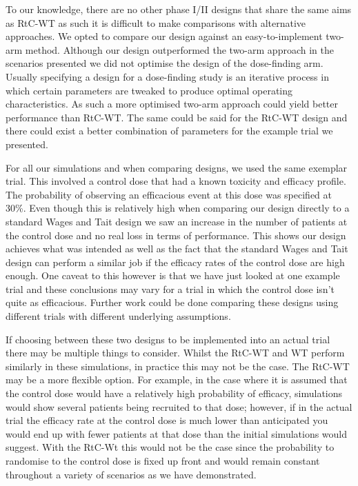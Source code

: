 To our knowledge, there are no other phase \RN{1}/\RN{2} designs that share the same aims as RtC-WT as such it is difficult to make comparisons with alternative approaches. We opted to compare our design against an easy-to-implement two-arm method. Although our design outperformed the two-arm approach in the scenarios presented we did not optimise the design of the dose-finding arm. Usually specifying a design for a dose-finding study is an iterative process in which certain parameters are tweaked to produce optimal operating characteristics. As such a more optimised two-arm approach could yield better performance than RtC-WT. The same could be said for the RtC-WT design and there could exist a better combination of parameters for the example trial we presented. 

For all our simulations and when comparing designs, we used the same exemplar trial. This involved a control dose that had a known toxicity and efficacy profile. The probability of observing an efficacious event at this dose was specified at 30\%. Even though this is relatively high when comparing our design directly to a standard Wages and Tait design we saw an increase in the number of patients at the control dose and no real loss in terms of performance. This shows our design achieves what was intended as well as the fact that the standard Wages and Tait design can perform a similar job if the efficacy rates of the control dose are high enough. One caveat to this however is that we have just looked at one example trial and these conclusions may vary for a trial in which the control dose isn't quite as efficacious. Further work could be done comparing these designs using different trials with different underlying assumptions. 

If choosing between these two designs to be implemented into an actual trial there may be multiple things to consider. Whilst the RtC-WT and WT perform similarly in these simulations, in practice this may not be the case. The RtC-WT may be a more flexible option. For example, in the case where it is assumed that the control dose would have a relatively high probability of efficacy, simulations would show several patients being recruited to that dose; however, if in the actual trial the efficacy rate at the control dose is much lower than anticipated you would end up with fewer patients at that dose than the initial simulations would suggest. With the RtC-Wt this would not be the case since the probability to randomise to the control dose is fixed up front and would remain constant throughout a variety of scenarios as we have demonstrated.

